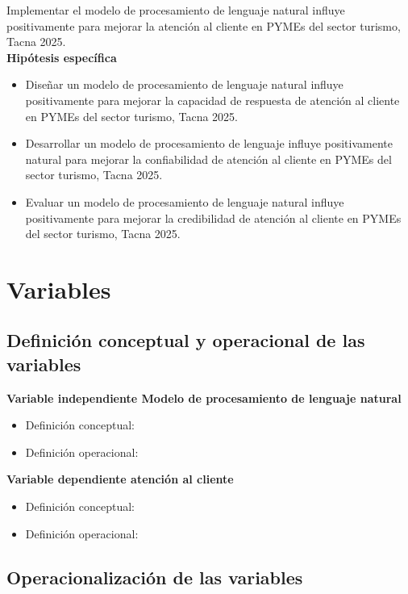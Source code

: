 Implementar el modelo de procesamiento de lenguaje natural influye positivamente para mejorar la atención al cliente en PYMEs del sector turismo, Tacna 2025.
\\

\textbf{Hipótesis específica}

\begin{itemize}
    \item Diseñar un modelo de procesamiento de lenguaje natural influye positivamente para mejorar la capacidad de respuesta de atención al cliente en PYMEs del sector turismo, Tacna 2025.
    \item Desarrollar un modelo de procesamiento de lenguaje influye positivamente natural para mejorar la confiabilidad de atención al cliente en PYMEs del sector turismo, Tacna 2025.
    \item Evaluar un modelo de procesamiento de lenguaje natural influye positivamente para mejorar la credibilidad de atención al cliente en PYMEs del sector turismo, Tacna 2025.
\end{itemize}

\section{Variables}

\subsection{Definición conceptual y operacional de las variables}
\textbf{
Variable independiente Modelo de procesamiento de lenguaje natural
}
\begin{itemize}
    \item Definición conceptual: 
    \item Definición operacional:
\end{itemize}

\textbf{
Variable dependiente atención al cliente
}
\begin{itemize}
    \item Definición conceptual: 
    \item Definición operacional: 
\end{itemize}

\subsection{Operacionalización de las variables}

